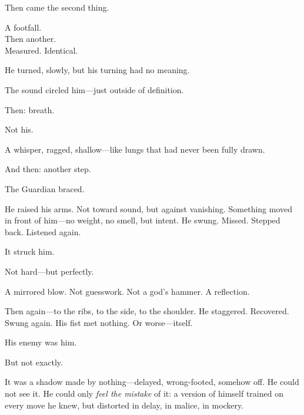 \documentclass[9pt]{article}
\begin{document}
\vspace{0.5em}
Then came the second thing.

\vspace{0.5em}
A footfall.\\
Then another.\\
Measured. Identical.

\vspace{0.5em}
He turned, slowly, but his turning had no meaning.

\vspace{0.5em}
The sound circled him---just outside of definition.

\vspace{0.5em}
Then: breath.

\vspace{0.5em}
Not his.

\vspace{0.5em}
A whisper, ragged, shallow---like lungs that had never been fully drawn.

\vspace{0.5em}
And then: another step.

\vspace{0.5em}
The Guardian braced.

\vspace{0.5em}
He raised his arms. Not toward sound, but against vanishing. Something moved in front of him---no weight, no smell, but intent. He swung. Missed. Stepped back. Listened again.

\vspace{0.5em}
It struck him.

\vspace{0.5em}
Not hard---but perfectly.

\vspace{0.5em}
A mirrored blow. Not guesswork. Not a god’s hammer. A reflection.

\vspace{0.5em}
Then again---to the ribs, to the side, to the shoulder. He staggered. Recovered. Swung again. His fist met nothing. Or worse---itself.

\vspace{0.5em}
His enemy was him.

\vspace{0.5em}
But not exactly.

\vspace{0.5em}
It was a shadow made by nothing---delayed, wrong-footed, somehow off. He could not see it. He could only \textit{feel the mistake} of it: a version of himself trained on every move he knew, but distorted in delay, in malice, in mockery.
\end{document}
